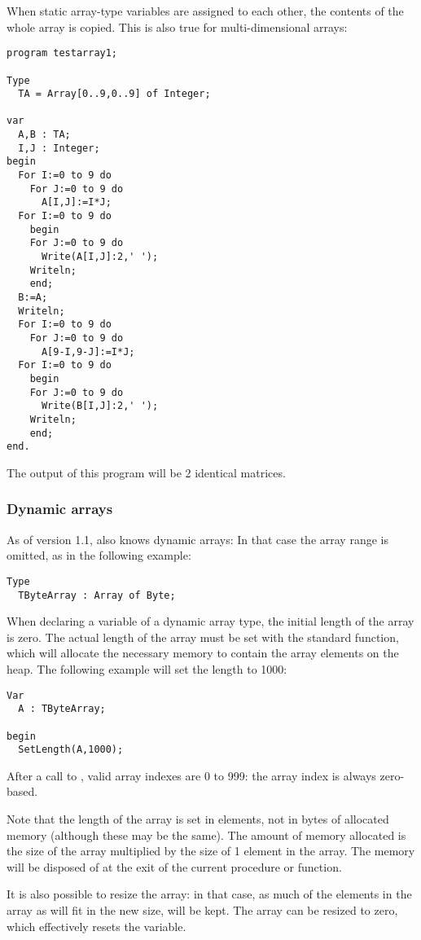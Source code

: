 When static array-type variables are assigned to each other, the contents of the
whole array is copied. This is also true for multi-dimensional arrays:
\begin{verbatim}
program testarray1;

Type
  TA = Array[0..9,0..9] of Integer;
  
var   
  A,B : TA;
  I,J : Integer;
begin
  For I:=0 to 9 do
    For J:=0 to 9 do 
      A[I,J]:=I*J;
  For I:=0 to 9 do
    begin
    For J:=0 to 9 do 
      Write(A[I,J]:2,' ');
    Writeln;
    end;
  B:=A;
  Writeln;
  For I:=0 to 9 do
    For J:=0 to 9 do 
      A[9-I,9-J]:=I*J;
  For I:=0 to 9 do
    begin
    For J:=0 to 9 do 
      Write(B[I,J]:2,' ');
    Writeln;
    end;
end.  
\end{verbatim}
The output of this program will be 2 identical matrices.

\subsubsection{Dynamic arrays}
As of version 1.1, \fpc also knows dynamic arrays: In that case the array
range is omitted, as in the following example:
\begin{verbatim}
Type
  TByteArray : Array of Byte;
\end{verbatim}
When declaring a variable of a dynamic array type, the initial length of the
array is zero. The actual length of the array must be set with the standard
 function, which will allocate the necessary memory to contain 
the array elements on the heap. The following example will set the length to
1000:
\begin{verbatim}
Var 
  A : TByteArray;

begin
  SetLength(A,1000);
\end{verbatim}
After a call to , valid array indexes are 0 to 999: the array
index is always zero-based.

Note that the length of the array is set in elements, not in bytes of 
allocated memory (although these may be the same). The amount of 
memory allocated is the size of the array multiplied by the size of 
1 element in the array. The memory will be disposed of at the exit of the
current procedure or function. 

It is also possible to resize the array: in that case, as much of the 
elements in the array as will fit in the new size, will be kept. The array
can be resized to zero, which effectively resets the variable.

